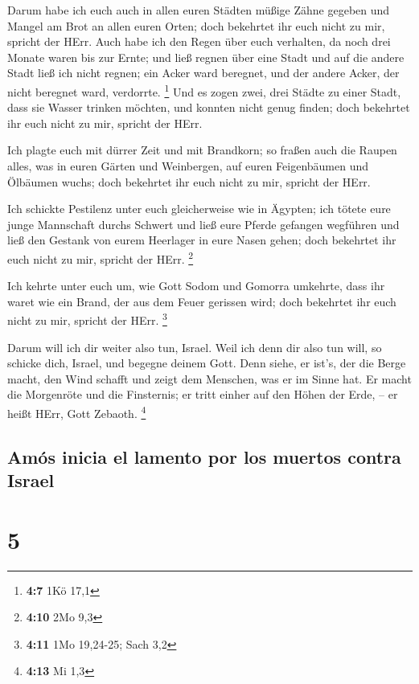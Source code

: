  Darum habe ich euch auch in allen euren Städten müßige
Zähne gegeben und Mangel am Brot an allen euren Orten; doch bekehrtet
ihr euch nicht zu mir, spricht der HErr.  Auch habe ich
den Regen über euch verhalten, da noch drei Monate waren bis zur Ernte;
und ließ regnen über eine Stadt und auf die andere Stadt ließ ich nicht
regnen; ein Acker ward beregnet, und der andere Acker, der nicht
beregnet ward, verdorrte. \footnote{\textbf{4:7} 1Kö 17,1}
 Und es zogen zwei, drei Städte zu einer Stadt, dass sie
Wasser trinken möchten, und konnten nicht genug finden; doch bekehrtet
ihr euch nicht zu mir, spricht der HErr.

 Ich plagte euch mit dürrer Zeit und mit Brandkorn; so
fraßen auch die Raupen alles, was in euren Gärten und Weinbergen, auf
euren Feigenbäumen und Ölbäumen wuchs; doch bekehrtet ihr euch nicht zu
mir, spricht der HErr.

 Ich schickte Pestilenz unter euch gleicherweise wie in
Ägypten; ich tötete eure junge Mannschaft durchs Schwert und ließ eure
Pferde gefangen wegführen und ließ den Gestank von eurem Heerlager in
eure Nasen gehen; doch bekehrtet ihr euch nicht zu mir, spricht der
HErr. \footnote{\textbf{4:10} 2Mo 9,3}

 Ich kehrte unter euch um, wie Gott Sodom und Gomorra
umkehrte, dass ihr waret wie ein Brand, der aus dem Feuer gerissen wird;
doch bekehrtet ihr euch nicht zu mir, spricht der HErr. \footnote{\textbf{4:11}
  1Mo 19,24-25; Sach 3,2}

 Darum will ich dir weiter also tun, Israel. Weil ich
denn dir also tun will, so schicke dich, Israel, und begegne deinem
Gott.  Denn siehe, er ist's, der die Berge macht, den
Wind schafft und zeigt dem Menschen, was er im Sinne hat. Er macht die
Morgenröte und die Finsternis; er tritt einher auf den Höhen der Erde,
-- er heißt HErr, Gott Zebaoth. \footnote{\textbf{4:13} Mi 1,3}

\hypertarget{amuxf3s-inicia-el-lamento-por-los-muertos-contra-israel}{%
\subsection{Amós inicia el lamento por los muertos contra
Israel}\label{amuxf3s-inicia-el-lamento-por-los-muertos-contra-israel}}

\hypertarget{section-4}{%
\section{5}\label{section-4}}


